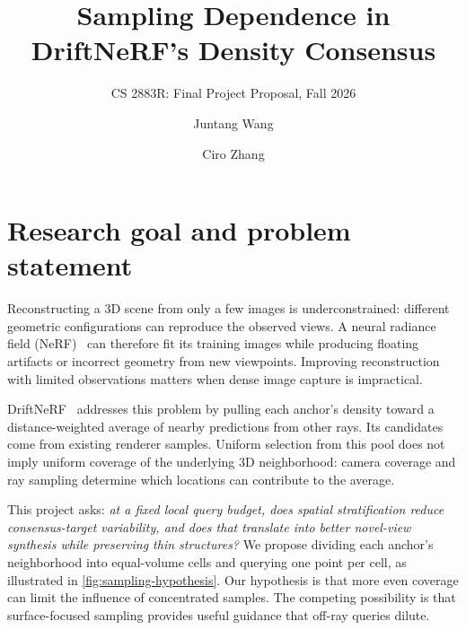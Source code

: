 \documentclass[sigconf,nonacm]{acmart}
\begin{document}
\title{Sampling Dependence in DriftNeRF's Density Consensus}
\subtitle{CS 2883R: Final Project Proposal, Fall 2026}
\author{Juntang Wang}
\author{Ciro Zhang}
\renewcommand{\shortauthors}{Wang and Zhang}

\maketitle
\raggedbottom
\balance

\section{Research goal and problem statement}\label{sec:goal}

Reconstructing a 3D scene from only a few images is underconstrained: different geometric configurations can reproduce the observed views. A neural radiance field (NeRF)~\citep{mildenhall2020nerf} can therefore fit its training images while producing floating artifacts or incorrect geometry from new viewpoints. Improving reconstruction with limited observations matters when dense image capture is impractical.

DriftNeRF~\citep{wang2026driftnerf} addresses this problem by pulling each anchor's density toward a distance-weighted average of nearby predictions from other rays. Its candidates come from existing renderer samples. Uniform selection from this pool does not imply uniform coverage of the underlying 3D neighborhood: camera coverage and ray sampling determine which locations can contribute to the average.

This project asks: \emph{at a fixed local query budget, does spatial stratification reduce consensus-target variability, and does that translate into better novel-view synthesis while preserving thin structures?} We propose dividing each anchor's neighborhood into equal-volume cells and querying one point per cell, as illustrated in \cref{fig:sampling-hypothesis}. Our hypothesis is that more even coverage can limit the influence of concentrated samples. The competing possibility is that surface-focused sampling provides useful guidance that off-ray queries dilute.
\end{document}
